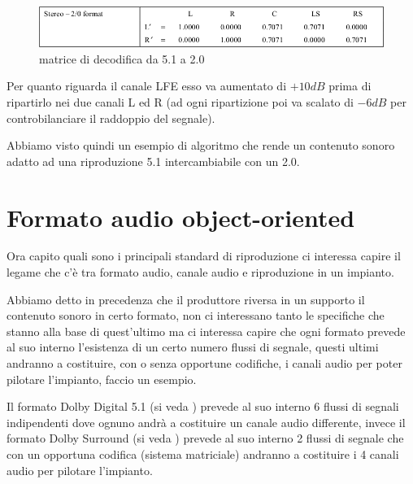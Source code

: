 \documentclass[12pt,a4paper]{report}
\begin{document}
\begin{figure}[htbp]
	\centering
	\includegraphics[scale=0.5]{figures/5-1to2-0.png}
	\caption {matrice di decodifica da 5.1 a 2.0}
	\label{fig:decodifica}
	\end{figure}

Per quanto riguarda il canale LFE esso va aumentato di $+10dB$ prima di ripartirlo nei due canali L ed R (ad ogni ripartizione poi va scalato di $-6dB$ per controbilanciare il raddoppio del segnale).

Abbiamo visto quindi un esempio di algoritmo che rende un contenuto sonoro adatto ad una riproduzione 5.1 intercambiabile con un 2.0.

\section{Formato audio object-oriented}

Ora capito quali sono i principali standard di riproduzione ci interessa capire il legame che c'è tra formato audio, canale audio e riproduzione in un impianto. 

Abbiamo detto in precedenza che il produttore riversa in un supporto il contenuto sonoro in certo formato, non ci interessano tanto le specifiche che stanno alla base di quest'ultimo ma ci interessa capire che ogni formato prevede al suo interno l'esistenza di un certo numero flussi di segnale, questi ultimi andranno a costituire, con o senza opportune codifiche, i canali audio per poter pilotare l'impianto, faccio un esempio.

Il formato Dolby Digital 5.1 (si veda \cite{digital}) prevede al suo interno 6 flussi di segnali indipendenti dove ognuno andrà a costituire un canale audio differente, invece il formato Dolby Surround (si veda \cite{surround}) prevede al suo interno 2 flussi di segnale che con un opportuna codifica (sistema matriciale) andranno a costituire i 4 canali audio per pilotare l'impianto. 
\end{document}
